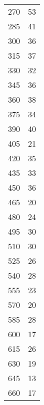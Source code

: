 \begin{table}
\begin{minipage}{.5\linewidth}
\begin{tabular}{c c}
            270	 &  53 \\
            285	 &  41 \\
            300	 &  36 \\
            315	 &  37 \\
            330	 &  32 \\
            345	 &  36 \\
            360	 &  38 \\
            375	 &  34 \\
            390	 &  40 \\
            405	 &  21 \\
            420	 &  35 \\
            435	 &  33 \\
            450	 &  36 \\
            465	 &  20 \\
            480	 &  24 \\
            495	 &  30 \\
            510	 &  30 \\
            525	 &  26 \\
            540	 &  28 \\
            555	 &  23 \\
            570	 &  20 \\
            585	 &  28 \\
            600	 &  17 \\
            615	 &  26 \\
            630	 &  19 \\
            645	 &  13 \\
            660	 &  17 \\
            \bottomrule
        \end{tabular}
    \end{minipage}
\end{table}


%
%

